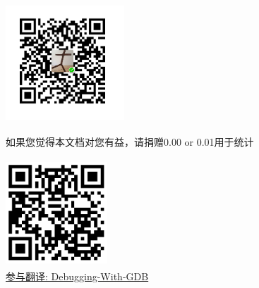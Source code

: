 \documentclass[class=book, crop=false]{standalone}
\begin{document}
\begin{CJK}{UTF8}{gbsn}
\begin{figure}[!htb]
\begin{minipage}{0.7\textwidth}
\raggedright
\includegraphics[width=1.75in,height=1.75in]{donate}
\caption*{如果您觉得本文档对您有益，请捐赠0.00 or 0.01用于统计}
\end{minipage}\hfill
\begin{minipage}{0.7\textwidth}
\raggedright
\includegraphics[width=1.50in,height=1.60in]{project_qrcode}
\caption*{\href{https://github.com/JerryOpenix/Debugging-With-GDB}{参与翻译: Debugging-With-GDB}}
\end{minipage}
\end{figure}

\cleardoublepage
\end{CJK}
\end{document}
